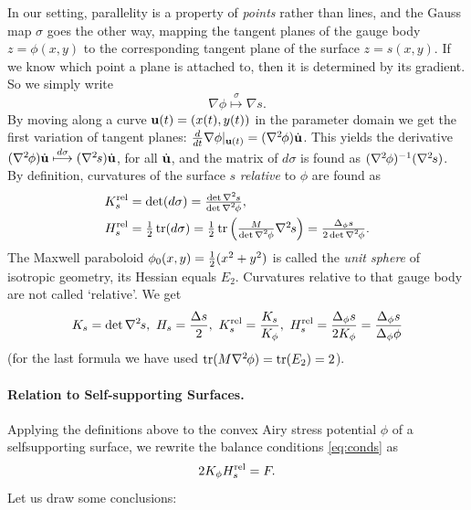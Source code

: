 \documentclass[annual]{acmsiggraph}
\def\tr{\mathop{\textrm{tr}}\nolimits}
\def\rel{{\mathord{\text{\rm rel}}}}
\def\ess{s}
\def\Hess#1{{\def\testess{#1}\nabla^2\ifx\testess\ess\!s\else #1\fi}}
\def\Hess#1{\text{$\nabla^2\hskip-.2ex #1$}}
\begin{document}
In our setting, parallelity is a property of {\em points} rather than
lines, and the Gauss map $\sigma$ goes the other way, mapping the tangent
planes of the gauge body $z=\phi(x,y)$ to the corresponding tangent plane
of the surface $z=s(x,y)$. If we know which point a plane is attached to,
then it is determined by its gradient. So we simply write
	$$\nabla \phi\overset\sigma\longmapsto\nabla s.
	$$
 By moving along a curve ${\mathbf u}(t)=(x(t),y(t))$ in the parameter domain we
get the first variation of tangent planes:
	$
	{d\over dt}\nabla \phi|_{\uw(t)} =
	(\Hess\phi)\dot\uw
	$.
 This yields the derivative
	$	
	(\Hess\phi)\dot\uw \overset{d\sigma}\longmapsto
	(\Hess s)\dot\uw $,
 for all $\dot{{\mathbf u}}$, and the matrix of $d\sigma$ is found as
$(\Hess\phi)^{-1}(\Hess s)$.  By definition, curvatures of the surface $s$
{\em relative} to $\phi$ are found as
	\begin{align*}
		K_s^\rel
	& = \textstyle
		\det(d\sigma) =
		{\det\Hess s \over \det\Hess\phi} ,
	\\
		H_s^\rel
	&= \textstyle
		{1\over 2}\tr(d\sigma)
		= {1\over 2}\tr \left({M\over\det\Hess\phi} \Hess s\right)
		=  {\Delta_\phi s \over 2\det\Hess\phi}.
	\end{align*}
 The Maxwell paraboloid $\phi_0(x,y)={1\over 2}(x^2+y^2)$ is called the
{\em unit sphere} of isotropic geometry, its Hessian equals $E_2$.
Curvatures relative to that gauge body are not called `relative'. We get
	\begin{align*}
	K_s = \det \Hess s,
		\
	H_s = {\Delta s \over 2},
		\
	K_s^\rel = {K_s\over K_\phi},
		\
	H_s^\rel =  {\Delta_\phi s \over 2 K_\phi}
			= {\Delta_\phi s\over \Delta_\phi \phi}
	\end{align*}
 (for the last formula we have used $\tr (M\Hess\phi)=\tr(E_2)=2$).

\paragraph{Relation to Self-supporting Surfaces.}

Applying the definitions above to the convex Airy stress potential $\phi$
of a self\dash supporting surface, we rewrite the balance conditions
\eqref{eq:conds} as
	\begin{equation}
	2 K_\phi H_s^\rel  = F.
	\label{equigeo}
	\end{equation}
 Let us draw some conclusions:
\end{document}
